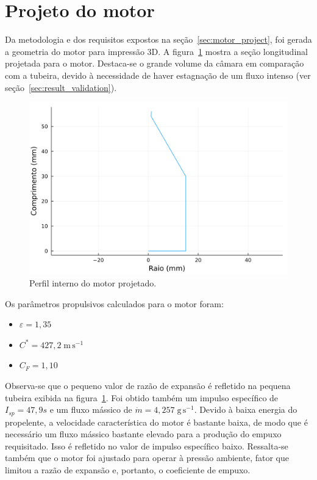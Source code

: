 
\section{Projeto do motor}

Da metodologia e dos requisitos expostos na seção~\ref{sec:motor_project}, foi gerada a geometria do motor para impressão 3D. A figura~\ref{fig:internal_profile} mostra a seção longitudinal projetada para o motor. Destaca-se o grande volume da câmara em comparação com a tubeira, devido à necessidade de haver estagnação de um fluxo intenso (ver seção~\ref{sec:result_validation}).

\begin{figure}[htbp]
    \centering
    \includegraphics[width=\textwidth]{img/internal_profile.png}
    \caption{Perfil interno do motor projetado.}\label{fig:internal_profile}
\end{figure}

Os parâmetros propulsivos calculados para o motor foram:
\begin{itemize}
    \item \( \varepsilon = 1,35 \)
    \item \(C^* = 427,2\;\mathrm{m}\,\mathrm{s}^{-1}\)
    \item \(C_{F} = 1,10\)
\end{itemize}

Observa-se que o pequeno valor de razão de expansão é refletido na pequena tubeira exibida na figura~\ref{fig:internal_profile}. Foi obtido também um impulso específico de \(I_{sp} = 47,9s\) e um fluxo mássico de \(\dot{m} = 4,257\;\mathrm{g}\,\mathrm{s}^{-1}\). Devido à baixa energia do propelente, a velocidade característica do motor é bastante baixa, de modo que é necessário um fluxo mássico bastante elevado para a produção do empuxo requisitado. Isso é refletido no valor de impulso específico baixo. Ressalta-se também que o motor foi ajustado para operar à pressão ambiente, fator que limitou a razão de expansão e, portanto, o coeficiente de empuxo. 

